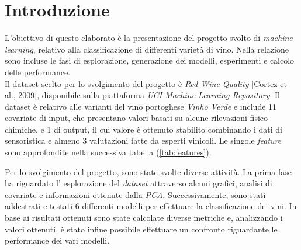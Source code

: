 \section{Introduzione}
    L'obiettivo di questo elaborato è la presentazione del progetto svolto di \textit{machine learning}, relativo alla classificazione di differenti varietà di vino. Nella relazione sono incluse le fasi di esplorazione, generazione dei modelli, esperimenti e calcolo delle performance. \\
    Il dataset scelto per lo svolgimento del progetto è \textit{Red Wine Quality} [Cortez et al., 2009], disponibile sulla piattaforma \textit{\href{https://archive.ics.uci.edu/ml/datasets/wine+quality}{UCI Machine Learning Repository}}. Il dataset è relativo alle varianti del vino portoghese \textit{Vinho Verde} e include 11 covariate di input, che presentano valori basati su alcune rilevazioni fisico-chimiche, e 1 di output, il cui valore è ottenuto stabilito combinando i dati di sensoristica e almeno 3 valutazioni fatte da esperti vinicoli. Le singole \textit{feature} sono approfondite nella successiva tabella (\ref{tab:features}).
    
    Per lo svolgimento del progetto, sono state svolte diverse attività. La prima fase ha riguardato l' esplorazione del \textit{dataset} attraverso alcuni grafici, analisi di covariate e informazioni ottenute dalla \textit{PCA}. Successivamente, sono stati addestrati e testati 6 differenti modelli per effettuare la classificazione dei vini. In base ai risultati ottenuti sono state calcolate diverse metriche e, analizzando i valori ottenuti, è stato infine possibile effettuare un confronto riguardante le performance dei vari modelli.
    
